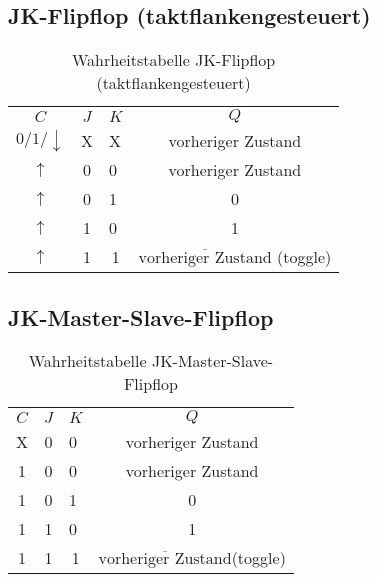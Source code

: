 \subsection{JK-Flipflop (taktflankengesteuert)}
\begin{table}[H]
  \begin{center}
  \begin{tabular}{cclc}
    \rowcolor{gray0} 
    $C$                & $J$ & $K$                   & $Q$                                           \\
    $0/ 1/ \downarrow$ & X   & X                     & vorheriger Zustand                            \\ \hline
    $\uparrow$         & 0   & 0                     & vorheriger Zustand                            \\
    $\uparrow$         & 0   & 1                     & 0                                             \\
    $\uparrow$         & 1   & 0                     & 1                                             \\
    $\uparrow$         & 1   & \multicolumn{1}{c}{1} & $\overline{\textrm{vorheriger Zustand}}$ (toggle)
  \end{tabular}
\end{center}
\caption{Wahrheitstabelle JK-Flipflop (taktflankengesteuert)}
\end{table}

\subsection{JK-Master-Slave-Flipflop}
\begin{table}[H]
  \begin{center}
    \begin{tabular}{cclc}
      \rowcolor{gray0} 
      $C$ & $J$ & $K$                   & $Q$                                         \\
      X   & 0   & 0                     & vorheriger Zustand                          \\ \hline
      1   & 0   & 0                     & vorheriger Zustand                          \\
      1   & 0   & 1                     & 0                                           \\
      1   & 1   & 0                     & 1                                           \\
      1   & 1   & \multicolumn{1}{c}{1} & $\overline{\textrm{vorheriger Zustand}}$(toggle)
    \end{tabular}
  \end{center}
\caption{Wahrheitstabelle JK-Master-Slave-Flipflop}
\end{table}